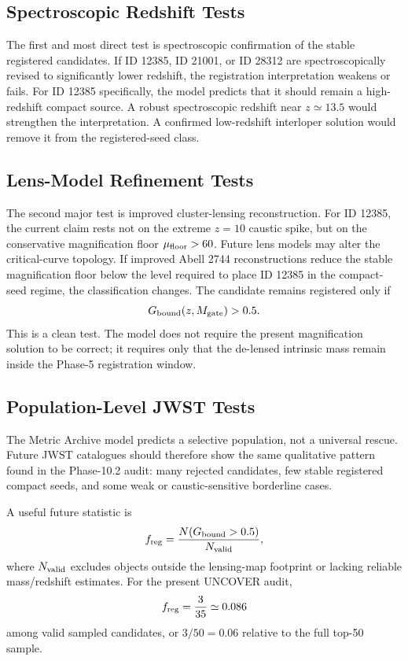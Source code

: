 \documentclass[11pt,a4paper]{article}
\begin{document}
\subsection{Spectroscopic Redshift Tests}

The first and most direct test is spectroscopic confirmation of the stable registered candidates. If ID 12385, ID 21001, or ID 28312 are spectroscopically revised to significantly lower redshift, the registration interpretation weakens or fails. For ID 12385 specifically, the model predicts that it should remain a high-redshift compact source. A robust spectroscopic redshift near $z\simeq13.5$ would strengthen the interpretation. A confirmed low-redshift interloper solution would remove it from the registered-seed class.

\subsection{Lens-Model Refinement Tests}

The second major test is improved cluster-lensing reconstruction. For ID 12385, the current claim rests not on the extreme $z=10$ caustic spike, but on the conservative magnification floor $\mu_{\rm floor}>60$. Future lens models may alter the critical-curve topology. If improved Abell 2744 reconstructions reduce the stable magnification floor below the level required to place ID 12385 in the compact-seed regime, the classification changes. The candidate remains registered only if
\begin{equation}
G_{\rm bound}(z,M_{\rm gate})>0.5.
\end{equation}
This is a clean test. The model does not require the present magnification solution to be correct; it requires only that the de-lensed intrinsic mass remain inside the Phase-5 registration window.

\subsection{Population-Level JWST Tests}

The Metric Archive model predicts a selective population, not a universal rescue. Future JWST catalogues should therefore show the same qualitative pattern found in the Phase-10.2 audit: many rejected candidates, few stable registered compact seeds, and some weak or caustic-sensitive borderline cases.

A useful future statistic is
\begin{equation}
f_{\rm reg}=\frac{N(G_{\rm bound}>0.5)}{N_{\rm valid}},
\end{equation}
where $N_{\rm valid}$ excludes objects outside the lensing-map footprint or lacking reliable mass/redshift estimates. For the present UNCOVER audit,
\begin{equation}
f_{\rm reg}=\frac{3}{35}\simeq0.086
\end{equation}
among valid sampled candidates, or $3/50=0.06$ relative to the full top-50 sample.
\end{document}
